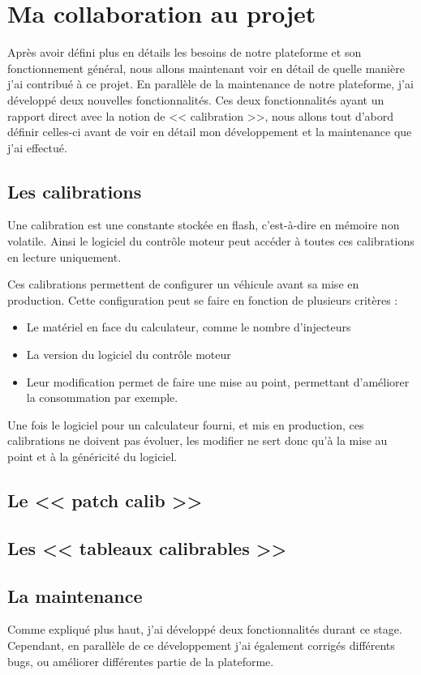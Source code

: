 \chapter{Ma collaboration au projet}\label{collab}
\putminitoc
Après avoir défini plus en détails les besoins de notre plateforme et son fonctionnement général, nous allons maintenant voir en détail de quelle manière j'ai contribué à ce projet. En parallèle de la maintenance de notre plateforme, j'ai développé deux nouvelles fonctionnalités. Ces deux fonctionnalités ayant un rapport direct avec la notion de << calibration >>, nous allons tout d'abord définir celles-ci avant de voir en détail mon développement et la maintenance que j'ai effectué.

\section{Les calibrations}
Une calibration est une constante stockée en flash, c'est-à-dire en mémoire non volatile. Ainsi le logiciel du contrôle moteur peut accéder à toutes ces calibrations en lecture uniquement.

Ces calibrations permettent de configurer un véhicule avant sa mise en production. Cette configuration peut se faire en fonction de plusieurs critères : 
\begin{itemize}
	\item Le matériel en face du calculateur, comme le nombre d'injecteurs
	\item La version du logiciel du contrôle moteur
	\item Leur modification permet de faire une mise au point, permettant d'améliorer la consommation par exemple.
\end{itemize}

Une fois le logiciel pour un calculateur fourni, et mis en production, ces calibrations ne doivent pas évoluer, les modifier ne sert donc qu'à la mise au point et à la généricité du logiciel.

\section{Le << patch calib >>}\label{patch}

\section{Les << tableaux calibrables >>}

\section{La maintenance}
Comme expliqué plus haut, j'ai développé deux fonctionnalités durant ce stage. Cependant, en parallèle de ce développement j'ai également corrigés différents bugs, ou améliorer différentes partie de la plateforme.

